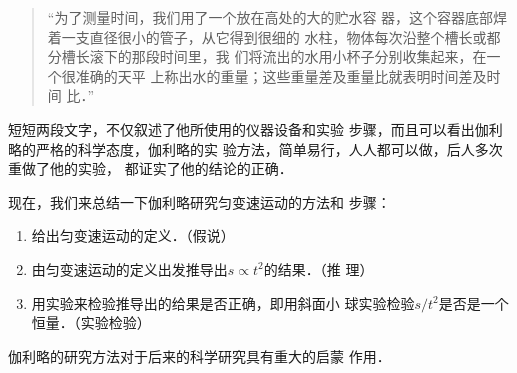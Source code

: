 \begin{quotation}
    “为了测量时间，我们用了一个放在高处的大的贮水容
器，这个容器底部焊着一支直径很小的管子，从它得到很细的
水柱，物体每次沿整个槽长或都分槽长滚下的那段时间里，我
们将流出的水用小杯子分别收集起来，在一个很准确的天平
上称出水的重量；这些重量差及重量比就表明时间差及时间
比．”
\end{quotation}

    短短两段文字，不仅叙述了他所使用的仪器设备和实验
步骤，而且可以看出伽利略的严格的科学态度，伽利略的实
验方法，简单易行，人人都可以做，后人多次重做了他的实验，
都证实了他的结论的正确．

    现在，我们来总结一下伽利略研究匀变速运动的方法和
步骤：
\begin{enumerate}
\item 给出匀变速运动的定义．（假说）
\item 由匀变速运动的定义出发推导出$s\propto t^2$的结果．（推
理）
\item 用实验来检验推导出的给果是否正确，即用斜面小
球实验检验$s/t^2$是否是一个恒量．（实验检验）
\end{enumerate}

伽利略的研究方法对于后来的科学研究具有重大的启蒙
作用．

